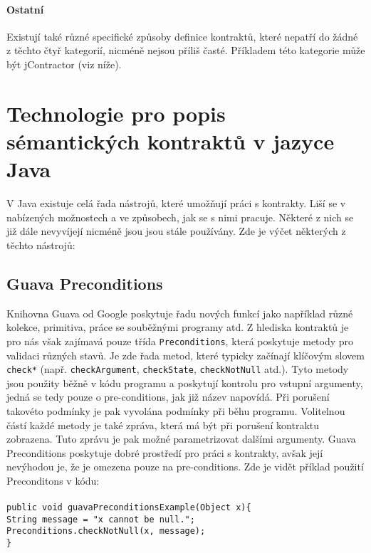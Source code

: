 		\paragraph{Ostatní}
		Existují také různé specifické způsoby definice kontraktů, které nepatří do žádné z těchto čtyř kategorií, nicméně nejsou příliš časté. Příkladem této kategorie může být jContractor (viz níže).
	


	\section{Technologie pro popis sémantických kontraktů v jazyce Java}
		V Java existuje celá řada nástrojů, které umožňují práci s kontrakty. Liší se v nabízených možnostech a ve způsobech, jak se s nimi pracuje. Některé z nich se již dále nevyvíjejí nicméně jsou jsou stále používány. Zde je výčet některých z těchto nástrojů:		
	
		\subsection{Guava Preconditions}
			Knihovna Guava \cite{guava} od Google poskytuje řadu nových funkcí jako například různé kolekce, primitiva, práce se souběžnými programy atd. Z hlediska kontraktů je pro nás však zajímavá pouze třída \texttt{Preconditions}, která poskytuje metody pro validaci různých stavů. Je zde řada metod, které typicky začínají klíčovým slovem \texttt{check*} (např. \texttt{checkArgument}, \texttt{checkState}, \texttt{checkNotNull} atd.). Tyto metody jsou použity běžně v kódu programu a poskytují kontrolu pro vstupní argumenty, jedná se tedy pouze o pre-conditions, jak již název napovídá. Při porušení takovéto podmínky je pak vyvolána podmínky při běhu programu. Volitelnou částí každé metody je také zpráva, která má být při porušení kontraktu zobrazena. Tuto zprávu je pak možné parametrizovat dalšími argumenty. Guava Preconditions poskytuje dobré prostředí pro práci s kontrakty, avšak její nevýhodou je, že je omezena pouze na pre-conditions. Zde je vidět příklad použití Preconditons v kódu:\\\\
			\- \- \- \- \- \texttt{public void guavaPreconditionsExample(Object x)\{}\\
			\- \- \- \- \- \- \- \- \- \- \texttt{String message = "x cannot be null.";}\\ 
        	\- \- \- \- \- \- \- \- \- \- \texttt{Preconditions.checkNotNull(x, message);}\\
    		\- \- \- \- \- \texttt{\}}\\
    		
